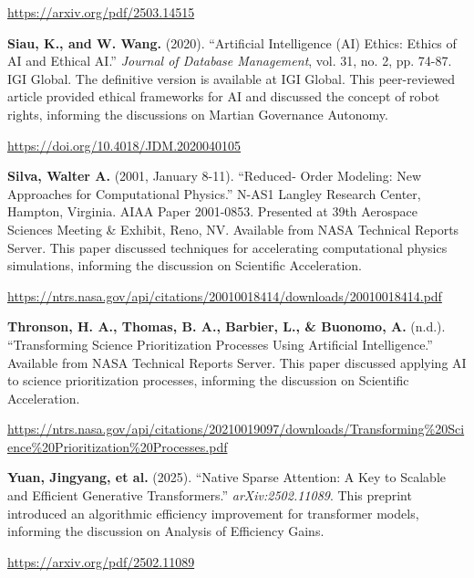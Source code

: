 \documentclass[fontsize=10pt, oneside, DIV=calc]{scrartcl}
\begin{document}
\href{https://arxiv.org/pdf/2503.14515}{\url{https://arxiv.org/pdf/2503.14515}}

\vspace{1em}
\noindent \textbf{Siau, K., and W. Wang.} (2020). ``Artificial Intelligence (AI) Ethics: Ethics of AI and Ethical AI.'' \textit{Journal of Database Management}, vol. 31, no. 2, pp. 74-87. IGI Global. The definitive version is available at IGI Global. This peer-reviewed article provided ethical frameworks for AI and discussed the concept of robot rights, informing the discussions on Martian Governance Autonomy. 



\href{https://doi.org/10.4018/JDM.2020040105}{\url{https://doi.org/10.4018/JDM.2020040105}}

\vspace{1em}
\noindent \textbf{Silva, Walter A.} (2001, January 8-11). ``Reduced- Order Modeling: New Approaches for Computational Physics.'' N-AS1 Langley Research Center, Hampton, Virginia. AIAA Paper 2001-0853. Presented at 39th Aerospace Sciences Meeting \& Exhibit, Reno, NV. Available from NASA Technical Reports Server. This paper discussed techniques for accelerating computational physics simulations, informing the discussion on Scientific Acceleration. 



\href{https://ntrs.nasa.gov/api/citations/20010018414/downloads/20010018414.pdf}{\url{https://ntrs.nasa.gov/api/citations/20010018414/downloads/20010018414.pdf}}

\vspace{1em}
\noindent \textbf{Thronson, H. A., Thomas, B. A., Barbier, L., \& Buonomo, A.} (n.d.). ``Transforming Science Prioritization Processes Using Artificial Intelligence.'' Available from NASA Technical Reports Server. This paper discussed applying AI to science prioritization processes, informing the discussion on Scientific Acceleration. 



\href{https://ntrs.nasa.gov/api/citations/20210019097/downloads/Transforming\%20Science\%20Prioritization\%20Processes.pdf}{\url{https://ntrs.nasa.gov/api/citations/20210019097/downloads/Transforming\%20Science\%20Prioritization\%20Processes.pdf}}

\vspace{1em}
\noindent \textbf{Yuan, Jingyang, et al.} (2025). ``Native Sparse Attention: A Key to Scalable and Efficient Generative Transformers.'' \textit{arXiv:2502.11089}. This preprint introduced an algorithmic efficiency improvement for transformer models, informing the discussion on Analysis of Efficiency Gains. 



\href{https://arxiv.org/pdf/2502.11089}{\url{https://arxiv.org/pdf/2502.11089}}

\newpage
{}  %
\renewcommand{\listfigurename}{List of Illustrations}
\begingroup
{}
\listoffigures
\endgroup
\end{document}
